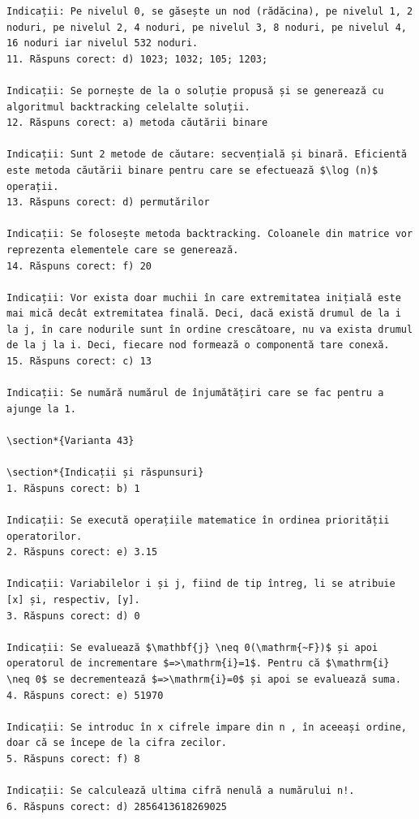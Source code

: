 \documentclass[10pt]{article}
\begin{document}
\begin{verbatim}
Indicații: Pe nivelul 0, se găsește un nod (rădăcina), pe nivelul 1, 2 noduri, pe nivelul 2, 4 noduri, pe nivelul 3, 8 noduri, pe nivelul 4, 16 noduri iar nivelul 532 noduri.
11. Răspuns corect: d) 1023; 1032; 105; 1203;

Indicații: Se pornește de la o soluție propusă și se generează cu algoritmul backtracking celelalte soluții.
12. Răspuns corect: a) metoda căutării binare

Indicații: Sunt 2 metode de căutare: secvențială și binară. Eficientă este metoda căutării binare pentru care se efectuează $\log (n)$ operații.
13. Răspuns corect: d) permutărilor

Indicații: Se folosește metoda backtracking. Coloanele din matrice vor reprezenta elementele care se generează.
14. Răspuns corect: f) 20

Indicații: Vor exista doar muchii în care extremitatea inițială este mai mică decât extremitatea finală. Deci, dacă există drumul de la i la j, în care nodurile sunt în ordine crescătoare, nu va exista drumul de la j la i. Deci, fiecare nod formează o componentă tare conexă.
15. Răspuns corect: c) 13

Indicații: Se numără numărul de înjumătățiri care se fac pentru a ajunge la 1.

\section*{Varianta 43}

\section*{Indicații și răspunsuri}
1. Răspuns corect: b) 1

Indicații: Se execută operațiile matematice în ordinea priorității operatorilor.
2. Răspuns corect: e) 3.15

Indicații: Variabilelor i și j, fiind de tip întreg, li se atribuie [x] și, respectiv, [y].
3. Răspuns corect: d) 0

Indicații: Se evaluează $\mathbf{j} \neq 0(\mathrm{~F})$ și apoi operatorul de incrementare $=>\mathrm{i}=1$. Pentru că $\mathrm{i} \neq 0$ se decrementează $=>\mathrm{i}=0$ și apoi se evaluează suma.
4. Răspuns corect: e) 51970

Indicații: Se introduc în x cifrele impare din n , în aceeași ordine, doar că se începe de la cifra zecilor.
5. Răspuns corect: f) 8

Indicații: Se calculează ultima cifră nenulă a numărului n!.
6. Răspuns corect: d) 2856413618269025


\end{verbatim}
\end{document}
